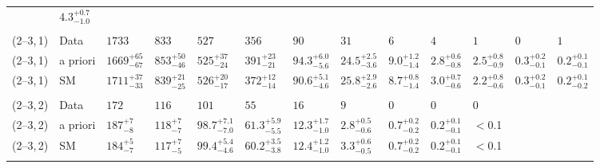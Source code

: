 \begin{table}[!t]
{\begin{tabular}{ lllllllllllll }
             & $4.3^{+0.7}_{-1.0}$                      \\\\[-2ex]
    (2--3,\,1)
             & Data
             & $1733$
             & $833$
             & $527$
             & $356$
             & $90$
             & $31$
             & $6$
             & $4$
             & $1$
             & $0$
             & $1$                                      \\
    (2--3,\,1)
             & a priori
             & $1669^{+65}_{-67}$
             & $853^{+50}_{-46}$
             & $525^{+37}_{-24}$
             & $391^{+23}_{-21}$
             & $94.3^{+6.0}_{-5.6}$
             & $24.5^{+2.5}_{-3.6}$
             & $9.0^{+1.2}_{-1.4}$
             & $2.8^{+0.6}_{-0.8}$
             & $2.5^{+0.8}_{-0.9}$
             & $0.3^{+0.2}_{-0.1}$
             & $0.2^{+0.1}_{-0.1}$                      \\
    (2--3,\,1)
             & SM
             & $1711^{+37}_{-33}$
             & $839^{+21}_{-25}$
             & $526^{+20}_{-17}$
             & $372^{+12}_{-14}$
             & $90.6^{+5.1}_{-4.6}$
             & $25.8^{+2.9}_{-2.6}$
             & $8.7^{+0.8}_{-1.4}$
             & $3.0^{+0.7}_{-0.6}$
             & $2.2^{+0.8}_{-0.6}$
             & $0.3^{+0.2}_{-0.1}$
             & $0.2^{+0.1}_{-0.2}$                      \\\\[-2ex]
    (2--3,\,2)
             & Data
             & $172$
             & $116$
             & $101$
             & $55$
             & $16$
             & $9$
             & $0$
             & $0$
             & $0$                                      \\
    (2--3,\,2)
             & a priori
             & $187^{+7}_{-8}$
             & $118^{+7}_{-7}$
             & $98.7^{+7.1}_{-7.0}$
             & $61.3^{+5.9}_{-5.5}$
             & $12.3^{+1.7}_{-1.0}$
             & $2.8^{+0.5}_{-0.6}$
             & $0.7^{+0.2}_{-0.2}$
             & $0.2^{+0.1}_{-0.1}$
             & $<$0.1                                   \\
    (2--3,\,2)
             & SM
             & $184^{+5}_{-7}$
             & $117^{+7}_{-5}$
             & $99.4^{+5.4}_{-4.6}$
             & $60.2^{+3.5}_{-3.8}$
             & $12.4^{+1.2}_{-1.0}$
             & $3.3^{+0.6}_{-0.5}$
             & $0.7^{+0.2}_{-0.2}$
             & $0.2^{+0.1}_{-0.1}$
             & $<$0.1                                   \\\\[-2ex]

\end{tabular}}
\end{table}
